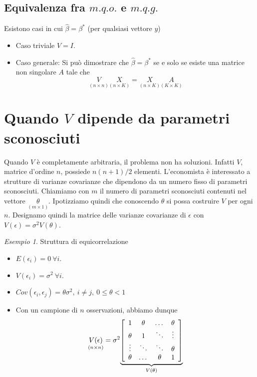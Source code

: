 \documentclass[a4paper]{report}
\newcounter{ese}
\theoremstyle{remark}
\newtheorem{esempio}[ese]{Esempio}
\newcounter{theor}
\begin{document}
\subsection{Equivalenza fra $m.q.o.$ e $m.q.g.$}

Esistono casi in cui $\hat{\beta}=\beta ^{\ast }$ (per qualsiasi vettore $y$)

\begin{itemize}
\item Caso triviale $V=I$.

\item Caso generale: Si pu\`{o} dimostrare che $\hat{\beta}=\beta ^{\ast }$
se e solo se esiste una matrice non singolare $A$ tale che 
\begin{equation}
\underset{(n\times n)}{V}\underset{(n\times K)}{X}=\underset{(n\times K)}{X}%
\underset{(K\times K)}{A}
\end{equation}
\end{itemize}

\section{Quando $V$ dipende da parametri sconosciuti}

Quando $V$ \`e completamente arbitraria, il problema non ha soluzioni.
Infatti $V$, matrice d'ordine $n$, possiede $n(n+1)/2$ elementi.
L'economista \`e interessato a strutture di varianze covarianze che
dipendono da un numero fisso di parametri sconosciuti. Chiamiamo con $m$ il
numero di parametri sconosciuti contenuti nel vettore $\underset{(m \times 1)%
}{\theta}$. Ipotizziamo quindi che conoscendo $\theta$ si possa costruire $V$
per ogni $n$. Designamo quindi la matrice delle varianze covarianze di $%
\epsilon$ con $V(\epsilon)=\sigma^2 V(\theta)$.

\begin{esempio}
Struttura di equicorrelazione

\begin{itemize}
\item $E(\epsilon_i) = 0 \ \forall i$.

\item $V(\epsilon_i) = \sigma^2 \ \forall i$.

\item $Cov(\epsilon_i,\epsilon_j)=\theta \sigma^2, \ i \ne j, \ 0 \le \theta
< 1$

\item Con un campione di $n$ osservazioni, abbiamo dunque 
\begin{equation}
\underset{(n\times n)}{V(\epsilon )}=\sigma ^{2}\underset{V(\theta )}{%
\underbrace{\left[ 
\begin{array}{cccc}
1 & \theta & \dots & \theta \\ 
\theta & 1 & \ddots & \vdots \\ 
\vdots & \ddots & \ddots & \theta \\ 
\theta & \dots & \theta & 1%
\end{array}%
\right] }}
\end{equation}
\end{itemize}
\end{esempio}
\end{document}

